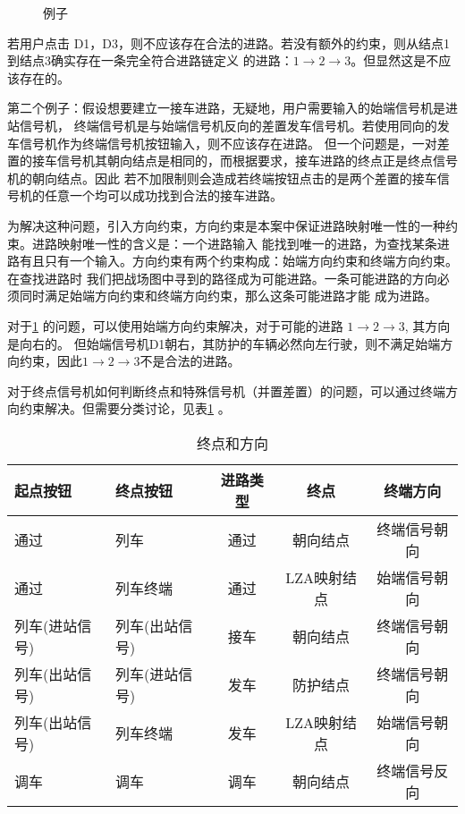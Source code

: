 \begin{figure}[ht]
    \centering
    
    \caption{\label{ens2}例子}
\end{figure}

若用户点击 D1，D3，则不应该存在合法的进路。若没有额外的约束，则从结点1到结点3确实存在一条完全符合进路链定义
的进路：$1 \rightarrow 2 \rightarrow 3$。但显然这是不应该存在的。

第二个例子：假设想要建立一接车进路，无疑地，用户需要输入的始端信号机是进站信号机，
终端信号机是与始端信号机反向的差置发车信号机。若使用同向的发车信号机作为终端信号机按钮输入，则不应该存在进路。
但一个问题是，一对差置的接车信号机其朝向结点是相同的，而根据要求，接车进路的终点正是终点信号机的朝向结点。因此
若不加限制则会造成若终端按钮点击的是两个差置的接车信号机的任意一个均可以成功找到合法的接车进路。

为解决这种问题，引入方向约束，方向约束是本案中保证进路映射唯一性的一种约束。进路映射唯一性的含义是：一个进路输入
能找到唯一的进路，为查找某条进路有且只有一个输入。方向约束有两个约束构成：始端方向约束和终端方向约束。在查找进路时
我们把战场图中寻到的路径成为可能进路。一条可能进路的方向必须同时满足始端方向约束和终端方向约束，那么这条可能进路才能
成为进路。

对于\ref{ens2} 的问题，可以使用始端方向约束解决，对于可能的进路 $1 \rightarrow 2 \rightarrow 3$, 其方向是向右的。
但始端信号机D1朝右，其防护的车辆必然向左行驶，则不满足始端方向约束，因此$1 \rightarrow 2 \rightarrow 3$不是合法的进路。

对于终点信号机如何判断终点和特殊信号机（并置差置）的问题，可以通过终端方向约束解决。但需要分类讨论，见表\ref{route_end} 。

\begin{table}[htpb!]
    \centering
    \caption{\label{route_end}终点和方向}
    \begin{threeparttable}
        \begin{tabular}{llccc}
            \toprule
            起点按钮       & 终点按钮       & 进路类型 & 终点        & 终端方向     \\
            \midrule
            通过           & 列车           & 通过     & 朝向结点    & 终端信号朝向 \\
            通过           & 列车终端       & 通过     & LZA映射结点 & 始端信号朝向 \\
            列车(进站信号) & 列车(出站信号) & 接车     & 朝向结点    & 终端信号朝向 \\
            列车(出站信号) & 列车(进站信号) & 发车     & 防护结点    & 终端信号朝向 \\
            列车(出站信号) & 列车终端       & 发车     & LZA映射结点 & 始端信号朝向 \\
            调车           & 调车           & 调车     & 朝向结点    & 终端信号反向 \\

            \bottomrule
        \end{tabular}
    \end{threeparttable}
\end{table}


